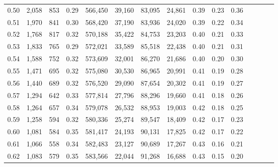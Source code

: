 \begin{tabular}{rrrcrrrrrrrrrrr}
0.50 &   2,058 &    853 &                                       0.29 &  566,450 &   39,160 &   83,095 &   24,861 &  0.39 &  0.23 &                         0.36 \\
0.51 &   1,970 &    841 &                                       0.30 &  568,420 &   37,190 &   83,936 &   24,020 &  0.39 &  0.22 &                         0.34 \\
0.52 &   1,768 &    817 &                                       0.32 &  570,188 &   35,422 &   84,753 &   23,203 &  0.40 &  0.21 &                         0.33 \\
0.53 &   1,833 &    765 &                                       0.29 &  572,021 &   33,589 &   85,518 &   22,438 &  0.40 &  0.21 &                         0.31 \\
0.54 &   1,588 &    752 &                                       0.32 &  573,609 &   32,001 &   86,270 &   21,686 &  0.40 &  0.20 &                         0.30 \\
0.55 &   1,471 &    695 &                                       0.32 &  575,080 &   30,530 &   86,965 &   20,991 &  0.41 &  0.19 &                         0.28 \\
0.56 &   1,440 &    689 &                                       0.32 &  576,520 &   29,090 &   87,654 &   20,302 &  0.41 &  0.19 &                         0.27 \\
0.57 &   1,294 &    642 &                                       0.33 &  577,814 &   27,796 &   88,296 &   19,660 &  0.41 &  0.18 &                         0.26 \\
0.58 &   1,264 &    657 &                                       0.34 &  579,078 &   26,532 &   88,953 &   19,003 &  0.42 &  0.18 &                         0.25 \\
0.59 &   1,258 &    594 &                                       0.32 &  580,336 &   25,274 &   89,547 &   18,409 &  0.42 &  0.17 &                         0.23 \\
0.60 &   1,081 &    584 &                                       0.35 &  581,417 &   24,193 &   90,131 &   17,825 &  0.42 &  0.17 &                         0.22 \\
0.61 &   1,066 &    558 &                                       0.34 &  582,483 &   23,127 &   90,689 &   17,267 &  0.43 &  0.16 &                         0.21 \\
0.62 &   1,083 &    579 &                                       0.35 &  583,566 &   22,044 &   91,268 &   16,688 &  0.43 &  0.15 &                         0.20 \\

\end{tabular}
